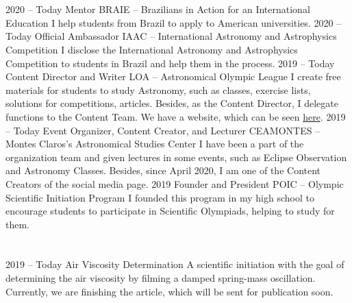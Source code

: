 \documentclass{cv}
\begin{document}
    \section*{}
        \begin{entrylist}
            \entry 
                {2020 -- Today}
                {Mentor}
                {BRAIE -- Brazilians in Action for an International Education}
                {I help students from Brazil to apply to American universities.}
            \entry
                {2020 -- Today}
                {Official Ambassador}
                {IAAC -- International Astronomy and Astrophysics Competition}
                {I disclose the International Astronomy and Astrophysics Competition to students in Brazil and help them in the process.}
            \entry
                {2019 -- Today}
                {Content Director and Writer}
                {LOA -- Astronomical Olympic League}
                {I create free materials for students to study Astronomy, such as classes, exercise lists, solutions for competitions, articles. Besides, as the Content Director, I delegate functions to the Content Team. We have a website, which can be seen \href{https://ligaolimpicadeastronomia.com.br/}{here}.}
            \entry
                {2019 -- Today}
                {Event Organizer, Content Creator, and Lecturer}
                {CEAMONTES -- Montes Claros's Astronomical Studies Center}
                {I have been a part of the organization team and given lectures in some events, such as Eclipse Observation and Astronomy Classes. Besides, since April 2020, I am one of the Content Creators of the social media page.}
            \entry
                {2019}
                {Founder and President}
                {POIC -- Olympic Scientific Initiation Program}
                {I founded this program in my high school to encourage students to participate in Scientific Olympiads, helping to study for them.}
        \end{entrylist}
    \section*{}
        \begin{entrylist}
            \entry
                {2019 -- Today}
                {Air Viscosity Determination}
                {}
                {A scientific initiation with the goal of determining the air viscosity by filming a damped spring-mass oscillation. Currently, we are finishing the article, which will be sent for publication soon.}
        \end{entrylist}
    
\end{document}
